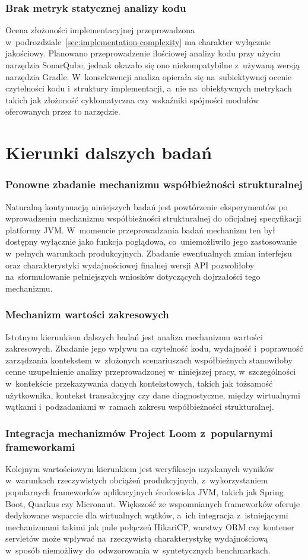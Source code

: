 \subsubsection{Brak metryk statycznej analizy kodu}
Ocena złożoności implementacyjnej przeprowadzona w~podrozdziale~\ref{sec:implementation-complexity} ma charakter wyłącznie jakościowy. Planowano przeprowadzenie ilościowej analizy kodu przy użyciu narzędzia SonarQube, jednak okazało się ono niekompatybilne z~używaną wersją narzędzia Gradle. W~konsekwencji analiza opierała się na~subiektywnej ocenie czytelności kodu i~struktury implementacji, a~nie na~obiektywnych metrykach takich jak złożoność cyklomatyczna czy wskaźniki spójności modułów oferowanych przez to narzędzie.

\section{Kierunki dalszych badań}

\subsubsection{Ponowne zbadanie mechanizmu współbieżności strukturalnej}
Naturalną kontynuacją niniejszych badań jest powtórzenie eksperymentów po wprowadzeniu mechanizmu współbieżności strukturalnej do oficjalnej specyfikacji platformy JVM. W~momencie przeprowadzania badań mechanizm ten był dostępny wyłącznie jako funkcja poglądowa, co~uniemożliwiło jego zastosowanie w~pełnych warunkach produkcyjnych. Zbadanie ewentualnych zmian interfejsu oraz charakterystyki wydajnościowej finalnej wersji API pozwoliłoby na~sformułowanie pełniejszych wniosków dotyczących dojrzałości tego mechanizmu.

\subsubsection{Mechanizm wartości zakresowych}
Istotnym kierunkiem dalszych badań jest analiza mechanizmu wartości zakresowych. Zbadanie jego wpływu na czytelność kodu, wydajność i~poprawność zarządzania kontekstem w~złożonych scenariuszach współbieżnych stanowiłoby cenne uzupełnienie analizy przeprowadzonej w~niniejszej pracy, w~szczególności w~kontekście przekazywania danych kontekstowych, takich jak tożsamość użytkownika, kontekst transakcyjny czy dane diagnostyczne, między wirtualnymi wątkami i~podzadaniami w~ramach zakresu współbieżności strukturalnej.

\subsubsection{Integracja mechanizmów Project Loom z~popularnymi frameworkami}
Kolejnym wartościowym kierunkiem jest weryfikacja uzyskanych wyników w~warunkach rzeczywistych obciążeń produkcyjnych, z~wykorzystaniem popularnych frameworków aplikacyjnych środowiska JVM, takich jak Spring Boot, Quarkus czy Micronaut. Większość ze wspomnianych frameworków oferuje dedykowane wsparcie dla wirtualnych wątków, a~ich integracja z~istniejącymi mechanizmami takimi jak pule połączeń HikariCP, warstwy ORM czy kontener servletów może wpływać na~rzeczywistą charakterystykę wydajnościową w~sposób niemożliwy do~odwzorowania w~syntetycznych benchmarkach.
